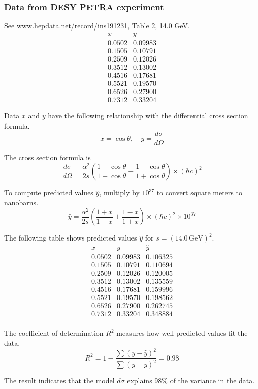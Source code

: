 \subsubsection*{Data from DESY PETRA experiment}
See www.hepdata.net/record/ins191231, Table 2, 14.0 GeV.
\begin{equation*}
\begin{matrix}
x & y\\
0.0502 & 0.09983\\
0.1505 & 0.10791\\
0.2509 & 0.12026\\
0.3512 & 0.13002\\
0.4516 & 0.17681\\
0.5521 & 0.19570\\
0.6526 & 0.27900\\
0.7312 & 0.33204
\end{matrix}
\end{equation*}

Data $x$ and $y$ have the following relationship
with the differential cross section formula.
\begin{equation*}
x=\cos\theta,
\quad
y=\frac{d\sigma}{d\Omega}
\end{equation*}

The cross section formula is
\begin{equation*}
\frac{d\sigma}{d\Omega}
=
\frac{\alpha^2}{2s}
\left(
\frac{1+\cos\theta}{1-\cos\theta}+
\frac{1-\cos\theta}{1+\cos\theta}
\right)\times(\hbar c)^2
\end{equation*}

To compute predicted values $\hat{y}$,
multiply by $10^{37}$ to convert square meters to nanobarns.
\begin{equation*}
\hat{y}
=
\frac{\alpha^2}{2s}
\left(
\frac{1+x}{1-x}+
\frac{1-x}{1+x}
\right)
\times(\hbar c)^2
\times10^{37}
\end{equation*}

The following table shows predicted values $\hat y$ for $s=(14.0\,\text{GeV})^2$.
\begin{equation*}
\begin{matrix}
x & y & \hat y\\
0.0502 & 0.09983 & 0.106325\\
0.1505 & 0.10791 & 0.110694\\
0.2509 & 0.12026 & 0.120005\\
0.3512 & 0.13002 & 0.135559\\
0.4516 & 0.17681 & 0.159996\\
0.5521 & 0.19570 & 0.198562\\
0.6526 & 0.27900 & 0.262745\\
0.7312 & 0.33204 & 0.348884\\
\end{matrix}
\end{equation*}

The coefficient of determination $R^2$ measures how well predicted values fit the data.
\begin{equation*}
R^2=1-\frac{\sum(y-\hat{y})^2}{\sum(y-\bar{y})^2}=0.98
\end{equation*}

The result indicates that the model $d\sigma$ explains 98\% of the variance in the data.


